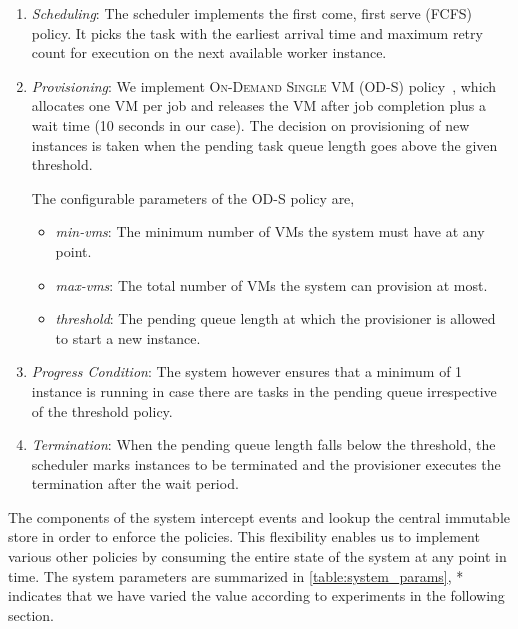 \documentclass[a4paper]{IEEEtran}
\begin{document}
\begin{enumerate}
  \item \emph{Scheduling}: The scheduler implements the first come, first serve (FCFS) policy.
  It picks the task with the earliest arrival time and maximum retry count for execution on the next available worker instance.

  \item \emph{Provisioning}: We implement \textsc{On-Demand Single VM (OD-S)} policy~\cite{od-s}, which allocates 
  one VM per job and releases the VM after job completion plus a wait time (10 seconds in our case). The decision on provisioning
  of new instances is taken when the pending task queue length goes above the given threshold.

  The configurable parameters of the OD-S policy are,
    \begin{itemize}
      \item \emph{min-vms}: The minimum number of VMs the system must have at any point.
      \item \emph{max-vms}: The total number of VMs the system can provision at most.
      \item \emph{threshold}: The pending queue length at which the provisioner is allowed to start a new instance. 
    \end{itemize} 

  \item \emph{Progress Condition}: The system however ensures that a minimum of 1 instance is running in case there are 
  tasks in the pending queue irrespective of the threshold policy. 

  \item \emph{Termination}: When the pending queue length falls below the threshold, the scheduler marks instances to be
  terminated and the provisioner executes the termination after the wait period.
\end{enumerate}

The components of the system intercept events and lookup the central immutable store in order to enforce the policies. 
This flexibility enables us to implement various other policies by consuming the entire state of the 
system at any point in time. The system parameters are summarized in \autoref{table:system_params}, * indicates that we have varied the value according to experiments in the following section.
\end{document}

